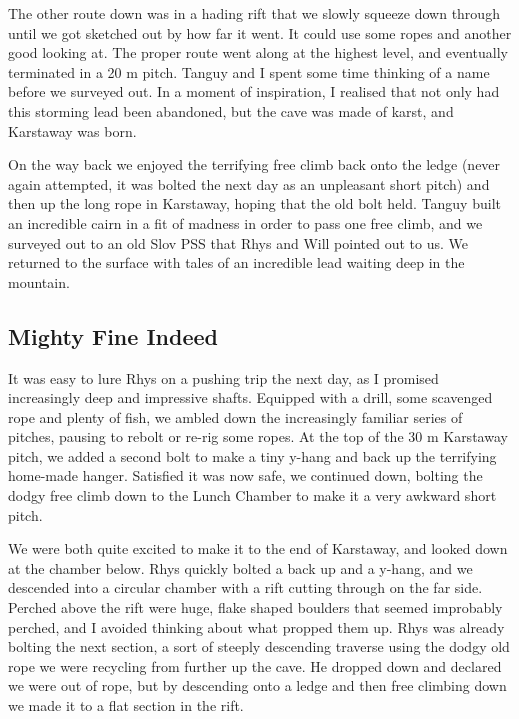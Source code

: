 The other route down was in a hading rift that we slowly squeeze down through until we got sketched out by how far it went. It could use some ropes and another good looking at. The proper route went along at the highest level, and eventually terminated in a 20 m pitch. Tanguy and I spent some time thinking of a name before we surveyed out. In a moment of inspiration, I realised that not only had this storming lead been abandoned, but the cave was made of karst, and Karstaway was born.
 
On the way back we enjoyed the terrifying free climb back onto the ledge (never again attempted, it was bolted the next day as an unpleasant short pitch) and then up the long rope in Karstaway, hoping that the old bolt held. Tanguy built an incredible cairn in a fit of madness in order to pass one free climb, and we surveyed out to an old Slov PSS that Rhys and Will pointed out to us. We returned to the surface with tales of an incredible lead waiting deep in the mountain.

\subsection{Mighty Fine Indeed}
\begin{marginfigure}
\end{marginfigure}
It was easy to lure Rhys on a pushing trip the next day, as I promised increasingly deep and impressive shafts. Equipped with a drill, some scavenged rope and plenty of fish, we ambled down the increasingly familiar series of pitches, pausing to rebolt or re-rig some ropes. At the top of the 30 m Karstaway pitch, we added a second bolt to make a tiny y-hang and back up the terrifying home-made hanger. Satisfied it was now safe, we continued down, bolting the dodgy free climb down to the Lunch Chamber to make it a very awkward short pitch.
 
We were both quite excited to make it to the end of Karstaway, and looked down at the chamber below. Rhys quickly bolted a back up and a y-hang, and we descended into a circular chamber with a rift cutting through on the far side. Perched above the rift were huge, flake shaped boulders that seemed improbably perched, and I avoided thinking about what propped them up. Rhys was already bolting the next section, a sort of steeply descending traverse using the dodgy old rope we were recycling from further up the cave. He dropped down and declared we were out of rope, but by descending onto a ledge and then free climbing down we made it to a flat section in the rift.
 

